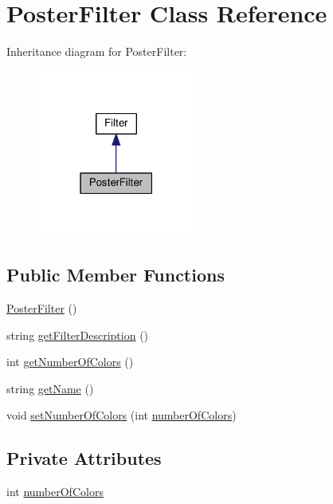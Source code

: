 \hypertarget{classModel_1_1PosterFilter}{}\section{Poster\+Filter Class Reference}
\label{classModel_1_1PosterFilter}


Inheritance diagram for Poster\+Filter\+:
\nopagebreak
\begin{figure}[H]
\begin{center}
\leavevmode
\includegraphics[width=147pt]{classModel_1_1PosterFilter__inherit__graph}
\end{center}
\end{figure}
\subsection*{Public Member Functions}
\begin{DoxyCompactItemize}
\item 
\hyperlink{classModel_1_1PosterFilter_a89cbfd099a8599b9b532d9c6a41fb997}{Poster\+Filter} ()
\item 
string \hyperlink{classModel_1_1PosterFilter_a62b7b60e24f92234393b840b35808e06}{get\+Filter\+Description} ()
\item 
int \hyperlink{classModel_1_1PosterFilter_ab9202ba7e871cc8488f73a14e4e6abef}{get\+Number\+Of\+Colors} ()
\item 
string \hyperlink{classModel_1_1PosterFilter_a11335e13e50af74108bf926dc1340b4b}{get\+Name} ()
\item 
void \hyperlink{classModel_1_1PosterFilter_a9a597e8af55b56d749dc67c3547a8d4e}{set\+Number\+Of\+Colors} (int \hyperlink{classModel_1_1PosterFilter_a84c387dad5d95eb7a12dbf283910935c}{number\+Of\+Colors})
\end{DoxyCompactItemize}
\subsection*{Private Attributes}
\begin{DoxyCompactItemize}
\item 
int \hyperlink{classModel_1_1PosterFilter_a84c387dad5d95eb7a12dbf283910935c}{number\+Of\+Colors}
\end{DoxyCompactItemize}
